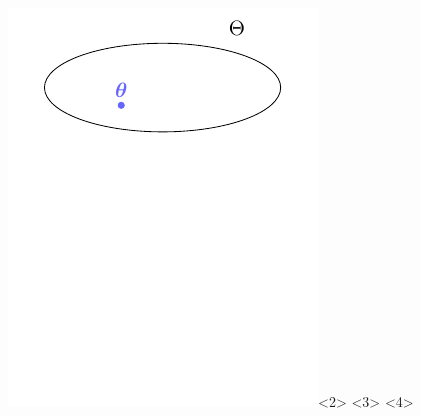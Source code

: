 \documentclass[aspectratio=169, table]{beamer}
\begin{document}
\begin{frame}[noframenumbering]
\begin{columns}
\begin{column}{.35\textwidth}
{	\includegraphics[]{animation/spaces2.pdf}}<2>

\end{column}
\end{columns}
\end{frame}
\end{document}
